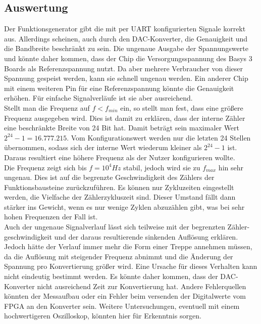 \subsection{Auswertung}
Der Funktionsgenerator gibt die mit per UART konfigurierten Signale korrekt aus.
Allerdings scheinen, auch durch den DAC-Konverter, die Genauigkeit und die Bandbreite beschränkt zu sein.
Die ungenaue Ausgabe der Spannungswerte  und  könnte daher kommen, dass der Chip die Versorgungsspannung des Basys 3 Boards als Referenzspannung nutzt.
Da aber mehrere Verbraucher von dieser Spannung gespeist werden, kann sie schnell ungenau werden.
Ein anderer Chip mit einem weiteren Pin für eine Referenzspannung könnte die Genauigkeit erhöhen.
Für einfache Signalverläufe ist sie aber ausreichend. \\
Stellt man die Frequenz auf $f < f_{min}$ ein, so stellt man fest, dass eine größere Frequenz ausgegeben wird.
Dies ist damit zu erklären, dass der interne Zähler eine beschränkte Breite von 24 Bit hat.
Damit beträgt sein maximaler Wert $2^{24} - 1 = 16.777.215$.
Vom Konfigurationswert werden nur die letzten 24 Stellen übernommen, sodass sich der interne Wert wiederum kleiner als $2^24 - 1$ ist.
Daraus resultiert eine höhere Frequenz als der Nutzer konfigurieren wollte.\\
Die Frequenz zeigt sich bis $f = 10^4 Hz$ stabil, jedoch wird sie zu $f_{max}$ hin sehr ungenau.
Dies ist auf die begrenzte Geschwindigkeit des Zählers der Funktionsbausteine zurückzuführen.
Es können nur Zykluzeiten eingestellt werden, die Vielfache der Zählerzykluszeit sind.
Dieser Umstand fällt dann stärker ins Gewicht, wenn es nur wenige Zyklen abzuzählen gibt, was bei sehr hohen Frequenzen der Fall ist. \\
Auch der ungenaue Signalverlauf lässt sich teilweise mit der begrenzten Zähler-geschwindigkeit und der daraus resultierende sinkenden Auflösung erklären.
Jedoch hätte der Verlauf immer mehr die Form einer Treppe annehmen müssen, da die Auflösung mit steigender Frequenz abnimmt und die Änderung der Spannung pro Konvertierung größer wird.
Eine Ursache für dieses Verhalten kann nicht eindeutig bestimmt werden.
Es könnte daher kommen, dass der DAC-Konverter nicht ausreichend Zeit zur Konvertierung hat.
Andere Fehlerquellen könnten der Messaufbau oder ein Fehler beim versenden der Digitalwerte vom FPGA an den Konverter sein.
Weitere Untersuchungen, eventuell mit einem hochwertigeren Oszilloskop, könnten hier für Erkenntnis sorgen.
